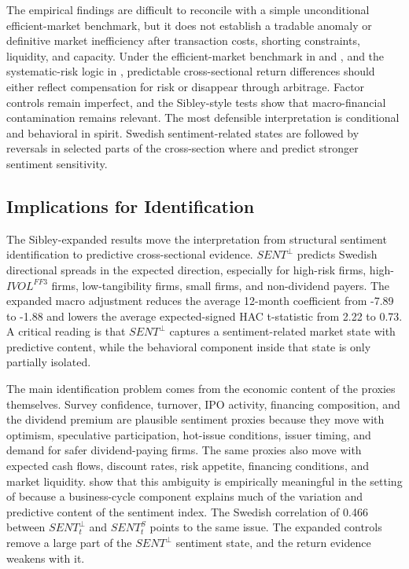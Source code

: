 \documentclass[11pt]{article}
\newcommand{\var}[1]{\ensuremath{#1}}
\begin{document}
The empirical findings are difficult to reconcile with a simple unconditional efficient-market benchmark, but it does not establish a tradable anomaly or definitive market inefficiency after transaction costs, shorting constraints, liquidity, and capacity. Under the efficient-market benchmark in \citet{fama1970efficient} and \citet{fama1991efficient}, and the systematic-risk logic in \citet{sharpe1964capital}, predictable cross-sectional return differences should either reflect compensation for risk or disappear through arbitrage. Factor controls remain imperfect, and the Sibley-style tests show that macro-financial contamination remains relevant. The most defensible interpretation is conditional and behavioral in spirit. Swedish sentiment-related states are followed by reversals in selected parts of the cross-section where \citet{baker2006sentiment} and \citet{stambaugh2012short} predict stronger sentiment sensitivity.

\subsection{Implications for Identification}
The Sibley-expanded results move the interpretation from structural sentiment identification to predictive cross-sectional evidence. \var{SENT^{\perp}} predicts Swedish directional spreads in the expected direction, especially for high-risk firms, high-\var{IVOL^{FF3}} firms, low-tangibility firms, small firms, and non-dividend payers. The expanded macro adjustment reduces the average 12-month coefficient from -7.89 to -1.88 and lowers the average expected-signed HAC t-statistic from 2.22 to 0.73. A critical reading is that \var{SENT^{\perp}} captures a sentiment-related market state with predictive content, while the behavioral component inside that state is only partially isolated.

The main identification problem comes from the economic content of the proxies themselves. Survey confidence, turnover, IPO activity, financing composition, and the dividend premium are plausible sentiment proxies because they move with optimism, speculative participation, hot-issue conditions, issuer timing, and demand for safer dividend-paying firms. The same proxies also move with expected cash flows, discount rates, risk appetite, financing conditions, and market liquidity. \citet{sibley2012sentimental} show that this ambiguity is empirically meaningful in the setting of \citet{baker2006sentiment} because a business-cycle component explains much of the variation and predictive content of the sentiment index. The Swedish correlation of 0.466 between \var{SENT^{\perp}_{t}} and \var{SENT^{S}_{t}} points to the same issue. The expanded controls remove a large part of the \var{SENT^{\perp}} sentiment state, and the return evidence weakens with it.
\end{document}
